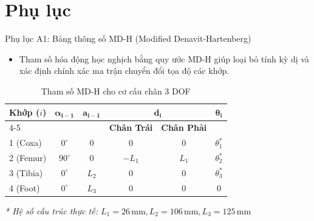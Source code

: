 \documentclass[10pt,aspectratio=169]{beamer}
\begin{document}
\appendix
\section*{Phụ lục}


\begin{frame}{Phụ lục A1: Bảng thông số MD-H (Modified Denavit-Hartenberg)}
  \begin{itemize}
      \item Tham số hóa động học nghịch bằng quy ước MD-H giúp loại bỏ tính kỳ dị và xác định chính xác ma trận chuyển đổi tọa độ các khớp.
  \end{itemize}
  \vspace{0.2cm}
  \begin{table}[htbp]
      \centering
      \caption{Tham số MD-H cho cơ cấu chân 3 DOF}
      \vspace{0.1cm}
      \def\arraystretch{1.4}
      \begin{tabular}{l c c c c c}
          \toprule
          \textbf{Khớp ($i$)} & $\boldsymbol{\alpha_{i-1}}$ & $\boldsymbol{a_{i-1}}$ & \multicolumn{2}{c}{$\boldsymbol{d_i}$} & $\boldsymbol{\theta_i}$ \\
          \cmidrule(lr){4-5}
          & & & \textbf{Chân Trái} & \textbf{Chân Phải} & \\
          \midrule
          1 (Coxa)  & $0^\circ$ & $0$   & $0$    & $0$   & $\theta_1^*$ \\
          2 (Femur) & $90^\circ$& $0$   & $-L_1$ & $L_1$ & $\theta_2^*$ \\
          3 (Tibia) & $0^\circ$ & $L_2$ & $0$    & $0$   & $\theta_3^*$ \\
          4 (Foot)  & $0^\circ$ & $L_3$ & $0$    & $0$   & $0$ \\
          \bottomrule
      \end{tabular}
  \end{table}
  {\small \textit{* Hệ số cấu trúc thực tế: $L_1=26\,\text{mm}, L_2=106\,\text{mm}, L_3=125\,\text{mm}$}}
\end{frame}
\end{document}

